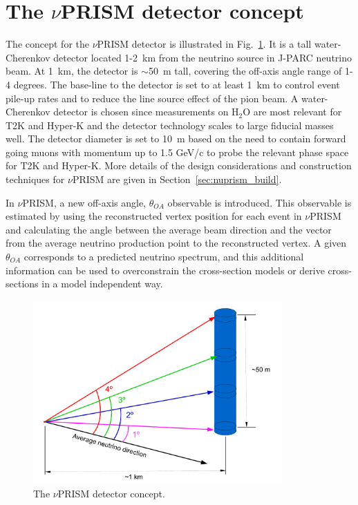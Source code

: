 \section{The $\nu$PRISM detector concept \label{sec:nuprism}}
The concept for the $\nu$PRISM detector is illustrated in Fig.~\ref{fig:nuprism_concept}.  It is a tall water-Cherenkov 
detector located 1-2~km from the neutrino source in J-PARC neutrino beam.  At 1~km, the detector is $\sim$50~m tall, covering
the off-axis angle range of 1-4 degrees. The base-line to the detector is set to at least 1~km to control event pile-up rates
and to reduce the line source effect of the pion beam.  A water-Cherenkov detector is chosen since measurements on H$_{2}$O are
most relevant for T2K and Hyper-K and the detector technology scales to large fiducial masses well.  The detector diameter is 
set to 10~m based on the need to contain forward going muons with momentum up to 1.5 GeV/c to probe the relevant phase space for
T2K and Hyper-K.  More details of the design considerations and construction techniques for $\nu$PRISM are given in 
Section~\ref{sec:nuprism_build}.

In $\nu$PRISM, a new off-axis angle, $\theta_{OA}$ observable is introduced.  This observable is estimated by using the reconstructed
vertex position for each event in $\nu$PRISM and calculating the angle between the average beam direction and the vector from the 
average neutrino production point to the reconstructed vertex.  A given $\theta_{OA}$ corresponds to a predicted neutrino spectrum,
and this additional information can be used to overconstrain the cross-section models or derive cross-sections in a model independent
way.

\begin{figure}
 \begin{center}
  \includegraphics[width=0.85\textwidth]{figures/nuprism_schematic.pdf}
  \caption{The $\nu$PRISM detector concept.}
  \label{fig:nuprism_concept}
  \end{center}
\end{figure}

